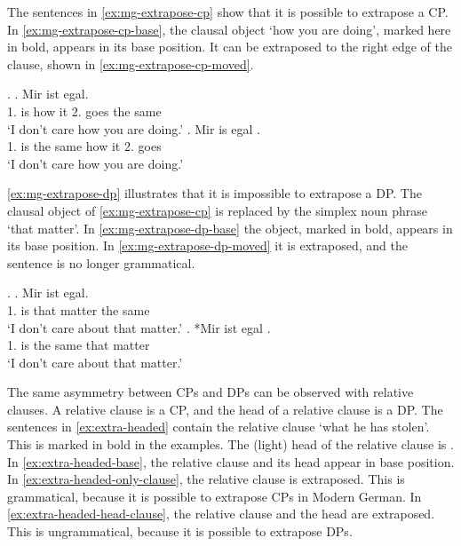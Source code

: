 The sentences in \ref{ex:mg-extrapose-cp} show that it is possible to extrapose a CP. In \ref{ex:mg-extrapose-cp-base}, the clausal object  `how you are doing', marked here in bold, appears in its base position. It can be extraposed to the right edge of the clause, shown in \ref{ex:mg-extrapose-cp-moved}.

\ex.\label{ex:mg-extrapose-cp}
\ag. Mir ist     egal.\\
 1. is how it 2. goes {the same}\\
 `I don't care how you are doing.' \label{ex:mg-extrapose-cp-base}
\bg. Mir is egal    .\\
 1. is {the same} how it 2. goes\\
 `I don't care how you are doing.' \label{ex:mg-extrapose-cp-moved}

\ref{ex:mg-extrapose-dp} illustrates that it is impossible to extrapose a DP. The clausal object of \ref{ex:mg-extrapose-cp} is replaced by the simplex noun phrase  `that matter'.
In \ref{ex:mg-extrapose-dp-base} the object, marked in bold, appears in its base position. In \ref{ex:mg-extrapose-dp-moved} it is extraposed, and the sentence is no longer grammatical.

\ex.\label{ex:mg-extrapose-dp}
\ag. Mir ist   egal.\\
 1. is that matter {the same}\\
 `I don't care about that matter.' \label{ex:mg-extrapose-dp-base}
\bg. *Mir ist egal  .\\
 1. is {the same} that matter\\
 `I don't care about that matter.' \label{ex:mg-extrapose-dp-moved}

The same asymmetry between CPs and DPs can be observed with relative clauses. A relative clause is a CP, and the head of a relative clause is a DP. The sentences in \ref{ex:extra-headed} contain the relative clause  `what he has stolen'. This is marked in bold in the examples. The (light) head of the relative clause is .
In \ref{ex:extra-headed-base}, the relative clause and its head appear in base position. In \ref{ex:extra-headed-only-clause}, the relative clause is extraposed. This is grammatical, because it is possible to extrapose CPs in Modern German. In \ref{ex:extra-headed-head-clause}, the relative clause and the head are extraposed. This is ungrammatical, because it is possible to extrapose DPs.

